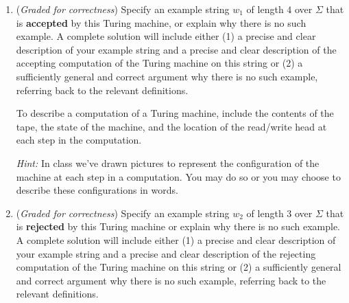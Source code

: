 \documentclass[12pt, oneside]{article}
\newcommand{\gradeCorrect}{({\it Graded for correctness}) }
\begin{document}
\begin{enumerate}[wide, labelwidth=!, labelindent=0pt]
\begin{center}
    \end{center}

    \begin{enumerate}

        \item\gradeCorrect Specify an example string $w_1$ of length $4$ over 
        $\Sigma$ that is {\bf accepted} by this Turing machine, or explain why there is no such 
        example. A complete solution will include either (1) a precise and clear 
        description of your example  string and a precise and clear description of the accepting computation
        of the Turing machine on this string or (2) a sufficiently
        general and correct argument why there is no such example, referring back to the relevant definitions.
        
        To describe a computation of a Turing machine, include the contents of the 
        tape, the state of the machine, and the location of the read/write head at each step in the computation.
        
        {\it Hint:} In class we've drawn pictures to represent the configuration of the machine at each step 
        in a computation.  You may do so or you may choose to describe these configurations in words.
        
        \item\gradeCorrect Specify an example string $w_2$ of length $3$ over $\Sigma$ 
        that is {\bf rejected} by this Turing machine
        or explain why there is no such 
        example. A complete solution will include either (1) a precise and clear 
        description of your example  string and a precise and clear description of the rejecting computation
        of the Turing machine on this string or (2) a sufficiently
        general and correct argument why there is no such example, referring back to the relevant definitions.


\end{enumerate}
\end{enumerate}
\end{document}
